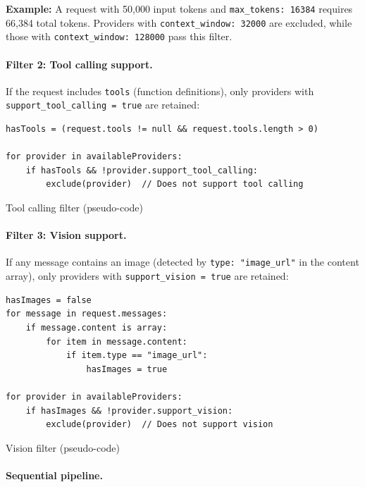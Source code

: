 \documentclass[english]{article}
\begin{document}
\textbf{Example:} A request with 50,000 input tokens and \texttt{max\_tokens: 16384} requires 66,384 total tokens. Providers with \texttt{context\_window: 32000} are excluded, while those with \texttt{context\_window: 128000} pass this filter.

\paragraph{Filter 2: Tool calling support.}

If the request includes \texttt{tools} (function definitions), only providers with \texttt{support\_tool\_calling = true} are retained:

\begin{listing}[H]
\begin{verbatim}
hasTools = (request.tools != null && request.tools.length > 0)

for provider in availableProviders:
    if hasTools && !provider.support_tool_calling:
        exclude(provider)  // Does not support tool calling
\end{verbatim}
\caption{Tool calling filter (pseudo-code)}
\end{listing}

\paragraph{Filter 3: Vision support.}

If any message contains an image (detected by \texttt{type: "image\_url"} in the content array), only providers with \texttt{support\_vision = true} are retained:

\begin{listing}[H]
\begin{verbatim}
hasImages = false
for message in request.messages:
    if message.content is array:
        for item in message.content:
            if item.type == "image_url":
                hasImages = true

for provider in availableProviders:
    if hasImages && !provider.support_vision:
        exclude(provider)  // Does not support vision
\end{verbatim}
\caption{Vision filter (pseudo-code)}
\end{listing}

\paragraph{Sequential pipeline.}
\end{document}
